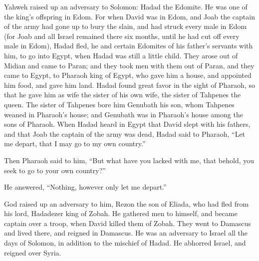  Yahweh raised up an adversary to Solomon: Hadad the
Edomite. He was one of the king's offspring in Edom.  For
when David was in Edom, and Joab the captain of the army had gone up to
bury the slain, and had struck every male in Edom  (for
Joab and all Israel remained there six months, until he had cut off
every male in Edom),  Hadad fled, he and certain Edomites
of his father's servants with him, to go into Egypt, when Hadad was
still a little child.  They arose out of Midian and came to
Paran; and they took men with them out of Paran, and they came to Egypt,
to Pharaoh king of Egypt, who gave him a house, and appointed him food,
and gave him land.  Hadad found great favor in the sight of
Pharaoh, so that he gave him as wife the sister of his own wife, the
sister of Tahpenes the queen.  The sister of Tahpenes bore
him Genubath his son, whom Tahpenes weaned in Pharaoh's house; and
Genubath was in Pharaoh's house among the sons of Pharaoh. 
When Hadad heard in Egypt that David slept with his fathers, and that
Joab the captain of the army was dead, Hadad said to Pharaoh, ``Let me
depart, that I may go to my own country.''

 Then Pharaoh said to him, ``But what have you lacked with
me, that behold, you seek to go to your own country?''

He answered, ``Nothing, however only let me depart.''

 God raised up an adversary to him, Rezon the son of
Eliada, who had fled from his lord, Hadadezer king of Zobah.
 He gathered men to himself, and became captain over a
troop, when David killed them of Zobah. They went to Damascus and lived
there, and reigned in Damascus.  He was an adversary to
Israel all the days of Solomon, in addition to the mischief of Hadad. He
abhorred Israel, and reigned over Syria.

